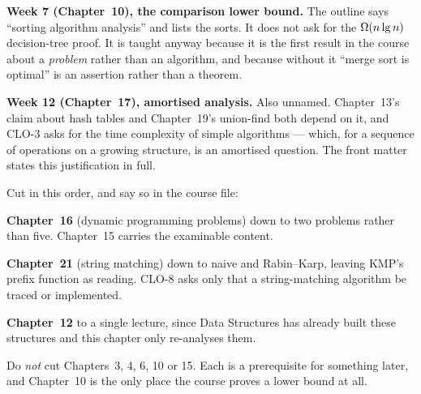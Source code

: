 \begin{conceptbox}
\textbf{Week 7 (Chapter~10), the comparison lower bound.} The outline says
``sorting algorithm analysis'' and lists the sorts. It does not ask for the
$\Omega(n\operatorname{lg} n)$ decision-tree proof. It is taught anyway because it is the
first result in the course about a \emph{problem} rather than an algorithm, and
because without it ``merge sort is optimal'' is an assertion rather than a
theorem.

\medskip
\textbf{Week 12 (Chapter~17), amortised analysis.} Also unnamed. Chapter~13's
claim about hash tables and Chapter~19's union-find both depend on it, and
CLO-3 asks for the time complexity of simple algorithms --- which, for a
sequence of operations on a growing structure, is an amortised question. The
front matter states this justification in full.
\end{conceptbox}

\begin{alertbox}
Cut in this order, and say so in the course file:

\begin{tightnum}
  \item \textbf{Chapter~16} (dynamic programming problems) down to two
        problems rather than five. Chapter~15 carries the examinable content.
  \item \textbf{Chapter~21} (string matching) down to naive and Rabin--Karp,
        leaving KMP's prefix function as reading. CLO-8 asks only that a
        string-matching algorithm be traced or implemented.
  \item \textbf{Chapter~12} to a single lecture, since Data Structures has
        already built these structures and this chapter only re-analyses them.
\end{tightnum}

\smallskip
Do \emph{not} cut Chapters~3, 4, 6, 10 or 15. Each is a prerequisite for
something later, and Chapter~10 is the only place the course proves a lower
bound at all.
\end{alertbox}
